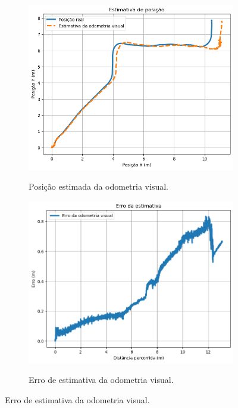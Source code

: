 \documentclass[repeatfields,xlists,xpacks,oneside,yearsonly]{ufrgscca}
\begin{document}
\begin{figure}[H]
    \caption{Resultado da odometria visual.}
    \label{fig:visual_odom_result}
    \begin{subfigure}{0.5\linewidth}
        {
            \centering
            \caption{Posição estimada da odometria visual.}
            \label{fig:odom_visual}
            \includegraphics[width=0.98\linewidth]{odom-visual-new.png}\\
        }
    \end{subfigure}
    \begin{subfigure}{0.5\linewidth}
        {
            \centering
            \caption{Erro de estimativa da odometria visual.}
            \label{fig:odom_visual_error}
            \includegraphics[width=0.98\linewidth]{odom-visual-error-new.png}\\
        }
    \end{subfigure}
\end{figure}
\end{document}

